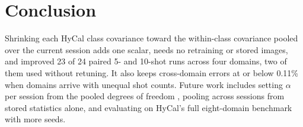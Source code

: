 \documentclass[letterpaper]{article} %
\begin{document}
\section{Conclusion}

Shrinking each HyCal class covariance toward the within-class covariance pooled over the current session adds one scalar, needs no retraining or stored images, and improved 23 of 24 paired 5- and 10-shot runs across four domains, two of them used without retuning. It also keeps cross-domain errors at or below 0.11\% when domains arrive with unequal shot counts. Future work includes setting $\alpha$ per session from the pooled degrees of freedom \citep{ledoit2004}, pooling across sessions from stored statistics alone, and evaluating on HyCal's full eight-domain benchmark with more seeds.


\end{document}
